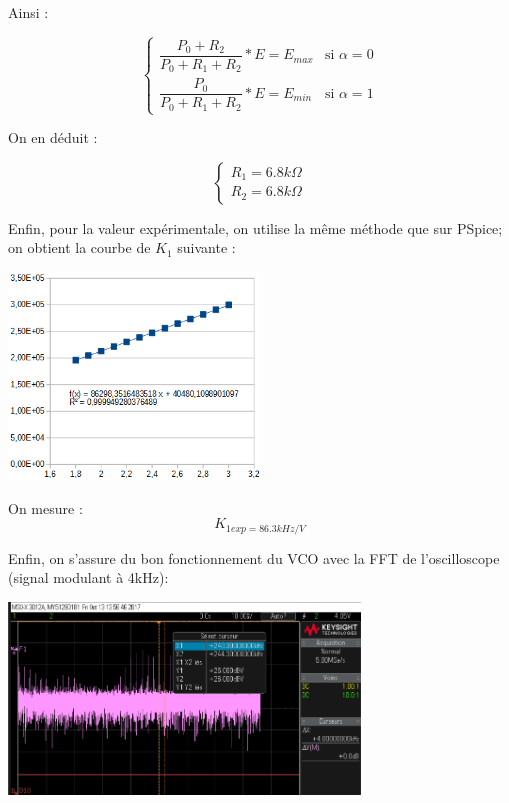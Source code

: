 \documentclass[a4paper]{report}
\begin{document}
Ainsi :
\begin{center}
$$
\left\{
    \begin{array}{ll}
        \dfrac{P_0 + R_2}{P_0 + R_1 + R_2}*E = E_{max} & \mbox{si } \alpha = 0 \\
        \dfrac{P_0}{P_0 + R_1 + R_2}*E = E_{min} & \mbox{si } \alpha = 1
    \end{array}
\right.
$$
\end{center}

On en déduit : 
\begin{center}
$$
\left\{
    \begin{array}{ll}
        R_1 = 6.8k\Omega \\
        R_2 = 6.8k\Omega
    \end{array}
\right.
$$
\end{center}

Enfin, pour la valeur expérimentale, on utilise la même méthode que sur PSpice; on obtient la courbe de $K_1$ suivante :

\begin{center}
\includegraphics[width=0.5\textwidth]{K1_exp.PNG}
\end{center}

On mesure : 
$$ K_{1exp = 86.3kHz/V} $$

Enfin, on s'assure du bon fonctionnement du VCO avec la FFT de l'oscilloscope (signal modulant à 4kHz): 

\begin{center}
\includegraphics[width=0.7\textwidth]{fft_vco.PNG}
\end{center}
\end{document}
